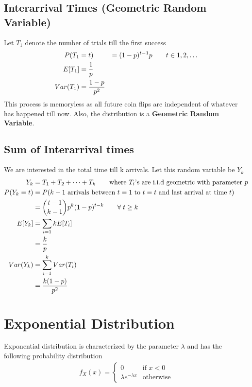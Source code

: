 \documentclass[11pt, a4paper]{article}
\begin{document}
    \subsection{Interarrival Times (Geometric Random Variable)}
    Let $T_{1}$ denote the number of trials till the first success
    \begin{align*}
        P(T_{1} &= t) &= (1-p)^{t-1}p \tag*{$t \in {1, 2, \ldots}$}\\
        E[T_{1}] &= \frac{1}{p}\\
        Var(T_{1}) &= \frac{1-p}{p^{2}}
    \end{align*}
    This process is memoryless as all future coin flips are independent of whatever has happened till now. Also, the distribution is a \textbf{Geometric Random Variable}.

    \subsection{Sum of Interarrival times}
    We are interested in the total time till k arrivals. Let this random variable be $Y_{k}$
    \begin{align*}
        Y_{k} &= T_{1} + T_{2} + \cdots + T_{k} \tag*{where $T_{i}$'s are i.i.d geometric with parameter $p$}\\
        P(Y_{k} = t) &= P(\text{$k-1$ arrivals between $t=1$ to $t=t$ and last arrival at time $t$})\\
           &= \binom{t-1}{k-1}p^{k}(1-p)^{t-k} \tag*{$\forall\; t \geq k$}\\
        E[Y_{k}] &= \sum_{i=1}{k}E[T_{i}]\\
                &= \frac{k}{p}\\
        Var(Y_{k}) &= \sum_{i=1}^{k}Var(T_{i})\\
                    &= \frac{k(1-p)}{p^{2}}
    \end{align*}


    \section{Exponential Distribution}
    Exponential distribution is characterized by the parameter $\lambda$ and has the following probability distribution
    \begin{align*}
        f_{X}(x) = \begin{cases} 0 &\mbox{if $x < 0$}\\
                                \lambda e^{-\lambda x} &\mbox{otherwise} \end{cases}
    \end{align*}
\end{document}

